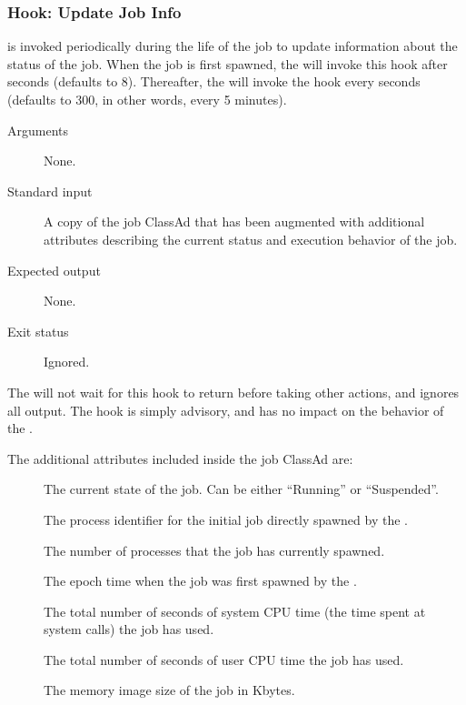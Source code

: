 \subsubsection{\label{sec:job-hooks-update-job-info}
Hook: Update Job Info}

 is invoked periodically during the
life of the job to update information about the status of the job.
When the job is first spawned, the  will invoke this
hook after  seconds
(defaults to 8).
Thereafter, the  will invoke the hook every 
 seconds (defaults to 300,
in other words, every 5 minutes).

\begin{description}
\item[Arguments]
  None.

\item[Standard input]
  A copy of the job ClassAd that has been augmented with additional
  attributes describing the current status and execution behavior of
  the job.

\item[Expected output]
  None.

\item[Exit status]
  Ignored.
\end{description}

The  will not wait for this hook to return before
taking other actions, and ignores all output.
The hook is simply advisory, and has no impact on the behavior of the
.

The additional attributes included inside the job ClassAd are:
\begin{description}
\item[]
  The current state of the job.
  Can be either ``Running'' or ``Suspended''.

\item[]
  The process identifier for the initial job directly spawned by the
  .

\item[]
  The number of processes that the job has currently spawned.

\item[]
  The epoch time when the job was first spawned by the .

\item[]
  The total number of seconds of system CPU time (the time spent at
  system calls) the job has used.

\item[]
  The total number of seconds of user CPU time the job has used.

\item[]
  The memory image size of the job in Kbytes.
\end{description}


